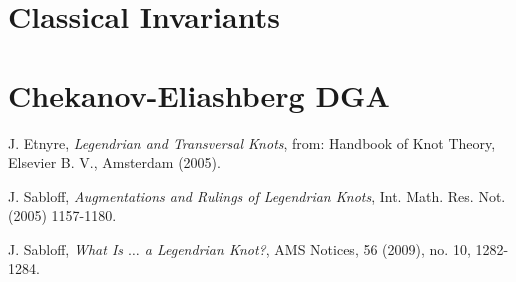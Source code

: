 \documentclass{article}
\begin{document}
\section{Classical Invariants}

\section{Chekanov-Eliashberg DGA}

\begin{thebibliography}{9}
    J. Etnyre,
    \textit{Legendrian and Transversal Knots},
    from: Handbook of Knot Theory,
    Elsevier B. V.,
    Amsterdam (2005).

    J. Sabloff,
    \textit{Augmentations and Rulings of Legendrian Knots},
    Int. Math. Res. Not. (2005) 1157-1180.

    J. Sabloff,
    \textit{What Is $\ldots$ a Legendrian Knot?},
    AMS Notices, 56 (2009), no. 10, 1282-1284.
\end{thebibliography}
\end{document}
